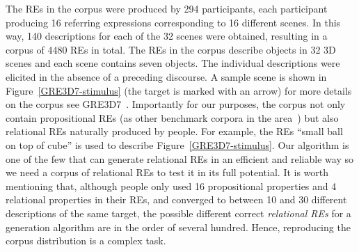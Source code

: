 The REs in the corpus were produced by 294 participants, each participant producing 16 referring expressions corresponding to 16 different scenes. In this way, 140 descriptions for each of the 32 scenes were obtained, resulting in a corpus of 4480 REs in total. 
The REs in the corpus describe objects in 32 3D scenes and each scene contains seven objects. The individual descriptions were elicited in the absence of a preceding discourse. 
A sample scene is shown in Figure~\ref{GRE3D7-stimulus} (the target is marked with an arrow) for more details on the corpus see GRE3D7~\cite[Chapter 5]{viet:gene11}. Importantly for our purposes, the corpus not only contain propositional REs (as other benchmark corpora in the area~\cite{gatt-balz-kow:2008:ENLG}) but also relational REs naturally produced by people. For example, the REs ``small ball on top of cube'' is used to describe Figure~\ref{GRE3D7-stimulus}. Our algorithm is one of the few that can generate relational REs in an efficient and reliable way so we need a corpus of relational REs to test it in its full potential. It is worth mentioning that, although people only used 16 propositional properties and 4 relational properties in their REs, and converged to between 10 and 30 different descriptions of the same target, the possible different correct \emph{relational REs} for a generation algorithm are in the order of several hundred. Hence, reproducing the corpus distribution is a complex task.    
% 
%
